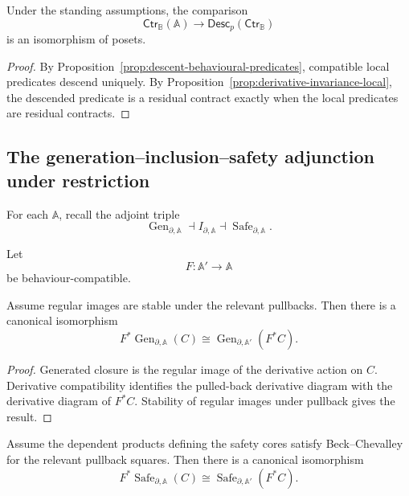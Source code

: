 \begin{theorem}
\label{thm:contract-descent}
Under the standing assumptions, the comparison
\[
    \mathsf{Ctr}_{\mathbb B}(\mathbb A)
    \longrightarrow
    \mathsf{Desc}_p(\mathsf{Ctr}_{\mathbb B})
\]
is an isomorphism of posets.
\end{theorem}

\begin{proof}
By Proposition~\ref{prop:descent-behavioural-predicates}, compatible local
predicates descend uniquely. By
Proposition~\ref{prop:derivative-invariance-local}, the descended predicate is
a residual contract exactly when the local predicates are residual contracts.
\end{proof}

\subsection{The generation--inclusion--safety adjunction under restriction}
\label{subsec:indexed-generation-inclusion-safety}

For each \(\mathbb A\), recall the adjoint triple
\[
    \operatorname{Gen}_{\partial,\mathbb A}
    \dashv
    I_{\partial,\mathbb A}
    \dashv
    \operatorname{Safe}_{\partial,\mathbb A}.
\]

Let
\[
    F:\mathbb A'\to\mathbb A
\]
be behaviour-compatible.

\begin{proposition}
\label{prop:generated-closure-input-restriction}
Assume regular images are stable under the relevant pullbacks. Then there is a
canonical isomorphism
\[
    F^\ast
    \operatorname{Gen}_{\partial,\mathbb A}(C)
    \cong
    \operatorname{Gen}_{\partial,\mathbb A'}
    (F^\ast C).
\]
\end{proposition}

\begin{proof}
Generated closure is the regular image of the derivative action on \(C\).
Derivative compatibility identifies the pulled-back derivative diagram with
the derivative diagram of \(F^\ast C\). Stability of regular images under
pullback gives the result.
\end{proof}

\begin{proposition}
\label{prop:safety-core-input-restriction}
Assume the dependent products defining the safety cores satisfy
Beck--Chevalley for the relevant pullback squares. Then there is a canonical
isomorphism
\[
    F^\ast
    \operatorname{Safe}_{\partial,\mathbb A}(C)
    \cong
    \operatorname{Safe}_{\partial,\mathbb A'}
    (F^\ast C).
\]
\end{proposition}

